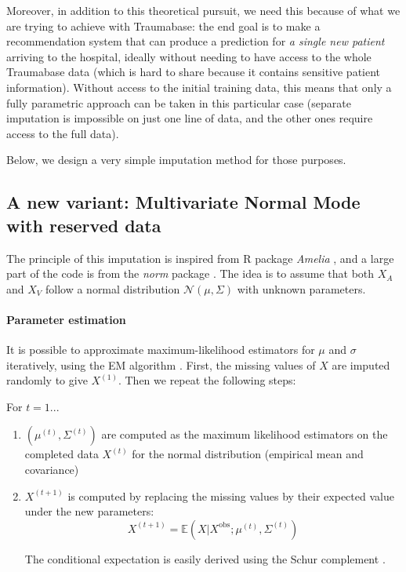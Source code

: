 \documentclass[12pt, a4paper]{memoir}
\begin{document}
Moreover, in addition to this theoretical pursuit, we need this because of what we are trying to achieve with Traumabase: the end goal is to make a recommendation system that can produce a prediction for \emph{a single new patient} arriving to the hospital, ideally without needing to have access to the whole Traumabase data (which is hard to share because it contains sensitive patient information). Without access to the initial training data, this means that only a fully parametric approach can be taken in this particular case (separate imputation is impossible on just one line of data, and the other ones require access to the full data).

Below, we design a very simple imputation method for those purposes.

		\subsection{A new variant: Multivariate Normal Mode with reserved data}
The principle of this imputation is inspired from R package \emph{Amelia} \cite{ref_amelia}, and a large part of the code is from the \emph{norm} package \cite{pkg_norm}. The idea is to assume that both $X_A$ and $X_V$ follow a normal distribution $\mathcal{N}(\mu, \Sigma)$ with unknown parameters.

\paragraph{Parameter estimation}
It is possible to approximate maximum-likelihood estimators for $\mu$ and $\sigma$ iteratively, using the EM algorithm \cite{EM} \cite{em_normal_fit}. First, the missing values of $X$ are imputed randomly to give $X^{(1)}$. Then we repeat the following steps:

For $t=1...$
\begin{enumerate}
\item $(\mu^{(t)}, \Sigma^{(t)})$ are computed as the maximum likelihood estimators on the completed data $X^{(t)}$ for the normal distribution (empirical mean and covariance)
\item $X^{(t+1)}$ is computed by replacing the missing values by their expected value under the new parameters: 
$$X^{(t+1)} = \mathbb{E}(X \vert X^{\text{obs}} ; \mu^{(t)}, \Sigma^{(t)})$$

The conditional expectation is easily derived using the Schur complement \cite{norm_schur}.
\end{enumerate}
\end{document}
